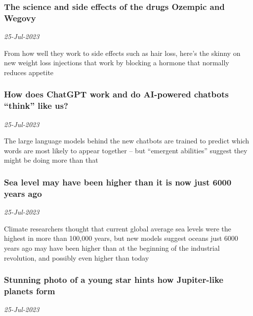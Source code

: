 \subsubsection{The science and side effects of the drugs Ozempic and Wegovy \href{https://www.newscientist.com/article/2371780-the-science-and-side-effects-of-the-drugs-ozempic-and-wegovy/?utm_campaign=RSS%7CNSNS&utm_source=NSNS&utm_medium=RSS&utm_content=home}{}}
\textit{25-Jul-2023}

From how well they work to side effects such as hair loss, here’s the skinny on new weight loss injections that work by blocking a hormone that normally reduces appetite
\subsubsection{How does ChatGPT work and do AI-powered chatbots “think” like us? \href{https://www.newscientist.com/article/2384030-how-does-chatgpt-work-and-do-ai-powered-chatbots-think-like-us/?utm_campaign=RSS%7CNSNS&utm_source=NSNS&utm_medium=RSS&utm_content=home}{\ding{225}}}
\textit{25-Jul-2023}

The large language models behind the new chatbots are trained to predict which words are most likely to appear together – but “emergent abilities” suggest they might be doing more than that
\subsubsection{Sea level may have been higher than it is now just 6000 years ago \href{https://www.newscientist.com/article/2383478-sea-level-may-have-been-higher-than-it-is-now-just-6000-years-ago/?utm_campaign=RSS%7CNSNS&utm_source=NSNS&utm_medium=RSS&utm_content=home}{}}
\textit{25-Jul-2023}

Climate researchers thought that current global average sea levels were the highest in more than 100,000 years, but new models suggest oceans just 6000 years ago may have been higher than at the beginning of the industrial revolution, and possibly even higher than today
\subsubsection{Stunning photo of a young star hints how Jupiter-like planets form \href{https://www.newscientist.com/article/2384275-stunning-photo-of-a-young-star-hints-how-jupiter-like-planets-form/?utm_campaign=RSS%7CNSNS&utm_source=NSNS&utm_medium=RSS&utm_content=home}{\ding{225}}}
\textit{25-Jul-2023}

